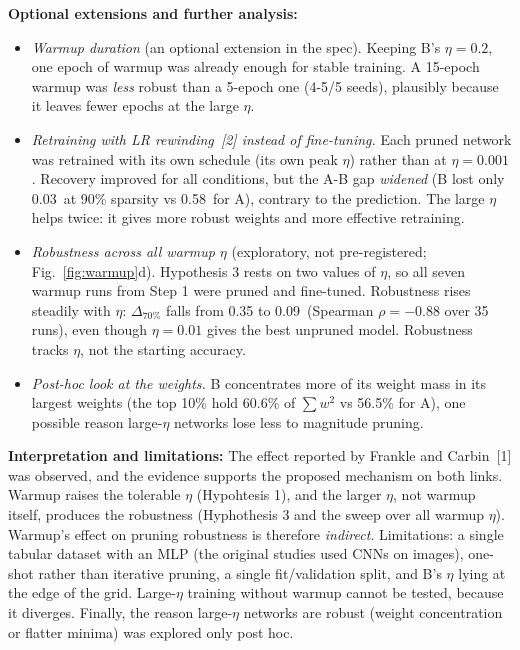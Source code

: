 \documentclass[10pt,a4paper]{article}
\newcommand{\A}{\,\text{\AA}}
\begin{document}
\textbf{Optional extensions and further analysis:}
\begin{itemize}
\item \emph{Warmup duration} (an optional extension in the spec). Keeping B's $\eta=0.2$, one epoch of warmup was already
enough for stable training. A 15-epoch warmup was \emph{less} robust than a 5-epoch one (4-5/5 seeds), plausibly because it
leaves fewer epochs at the large $\eta$.
\item \emph{Retraining with LR rewinding~[2] instead of fine-tuning.} Each pruned network was retrained with its own schedule
(its own peak $\eta$) rather than at $\eta=0.001$. Recovery improved for all conditions, but the A-B gap \emph{widened}
(B lost only 0.03\A{} at 90\% sparsity vs 0.58\A{} for A), contrary to the prediction. The large $\eta$ helps twice:
it gives more robust weights and more effective retraining.
\item \emph{Robustness across all warmup $\eta$} (exploratory, not pre-registered; Fig.~\ref{fig:warmup}d). Hypothesis 3 rests on two
values of $\eta$, so all seven warmup runs from Step 1 were pruned and fine-tuned. Robustness rises steadily with $\eta$:
$\Delta_{70\%}$ falls from 0.35 to 0.09\A{} (Spearman $\rho=-0.88$ over 35 runs), even though $\eta=0.01$ gives the best
unpruned model. Robustness tracks $\eta$, not the starting accuracy.
\item \emph{Post-hoc look at the weights.} B concentrates more of its weight mass in its largest weights (the top 10\% hold
60.6\% of $\sum w^2$ vs 56.5\% for A), one possible reason large-$\eta$ networks lose less to magnitude pruning.
\end{itemize}

\textbf{Interpretation and limitations:} The effect reported by Frankle and Carbin~[1] was observed, and the evidence
supports the proposed mechanism on both links. Warmup raises the tolerable $\eta$ (Hypohtesis 1), and the larger $\eta$, not
warmup itself, produces the robustness (Hyphothesis 3 and the sweep over all warmup $\eta$). Warmup's effect on pruning robustness is therefore
\emph{indirect}. Limitations: a single tabular dataset with an MLP (the original studies used CNNs on images),
one-shot rather than iterative pruning, a single fit/validation split, and B's $\eta$ lying at the edge of the grid. Large-$\eta$
training without warmup cannot be tested, because it diverges. Finally, the reason large-$\eta$ networks are robust (weight
concentration or flatter minima) was explored only post hoc.
\end{document}

